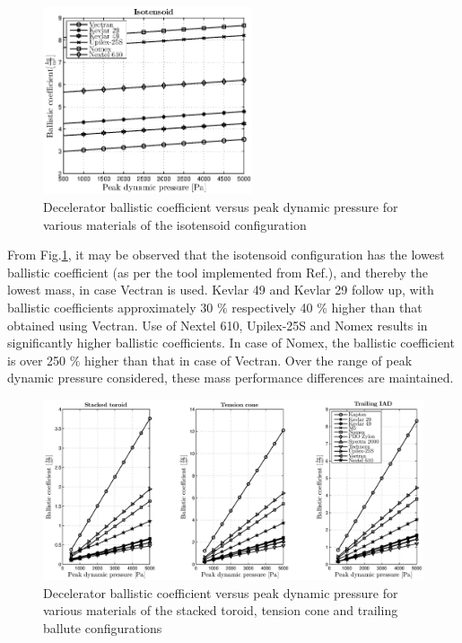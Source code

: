 \begin{figure}[H]
\centering
\includegraphics[width = 0.55\textwidth]{Figure/ISO_mat.eps}
\caption{Decelerator ballistic coefficient versus peak dynamic pressure for various materials of the isotensoid configuration}
\label{fig:ISO_mat}
\end{figure}
From Fig.\ref{fig:ISO_mat}, it may be observed that the isotensoid configuration has the lowest ballistic coefficient (as per the tool implemented from Ref.\cite{Anderson1969}), and thereby the lowest mass, in case Vectran is used. Kevlar 49 and Kevlar 29 follow up, with ballistic coefficients approximately 30 $\%$ respectively 40 $\%$ higher than that obtained using Vectran. Use of Nextel 610, Upilex-25S and Nomex results in significantly higher ballistic coefficients. In case of Nomex, the ballistic coefficient is over 250 $\%$ higher than that in case of Vectran. Over the range of peak dynamic pressure considered, these mass performance differences are maintained. 

\begin{figure}[H]
\hspace{-35mm}
\includegraphics[width = 1.35\textwidth]{Figure/all_mat.eps}
\caption{Decelerator ballistic coefficient versus peak dynamic pressure for various materials of the stacked toroid, tension cone and trailing ballute configurations}
\label{fig:all_mat}
\end{figure}

